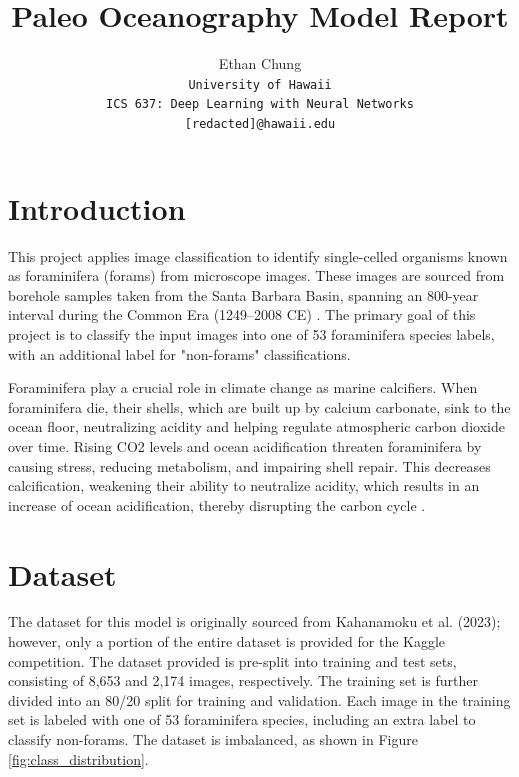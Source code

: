 \documentclass[letterpaper]{article}
\begin{document}
\title{Paleo Oceanography Model Report}

\author{Ethan Chung\\
    {\tt\small University of Hawaii}\\
    {\tt\small ICS 637: Deep Learning with Neural Networks}\\
    {\tt\small [redacted]@hawaii.edu}}

\maketitle

\section{Introduction}

    This project applies image classification to identify single-celled organisms known as foraminifera (forams) from microscope images. These images are sourced from borehole samples taken from the Santa Barbara Basin, spanning an 800-year interval during the Common Era (1249–2008 CE) \cite{kahanamoku23}. The primary goal of this project is to classify the input images into one of 53 foraminifera species labels, with an additional label for "non-forams" classifications.

    Foraminifera play a crucial role in climate change as marine calcifiers. When foraminifera die, their shells, which are built up by calcium carbonate, sink to the ocean floor, neutralizing acidity and helping regulate atmospheric carbon dioxide over time. Rising CO2 levels and ocean acidification threaten foraminifera by causing stress, reducing metabolism, and impairing shell repair. This decreases calcification, weakening their ability to neutralize acidity, which results in an increase of ocean acidification, thereby disrupting the carbon cycle \cite{kerlin17}.
    
\section{Dataset}

    The dataset for this model is originally sourced from Kahanamoku et al. (2023); however, only a portion of the entire dataset is provided for the Kaggle competition. The dataset provided is pre-split into training and test sets, consisting of 8,653 and 2,174 images, respectively. The training set is further divided into an 80/20 split for training and validation. Each image in the training set is labeled with one of 53 foraminifera species, including an extra label to classify non-forams. The dataset is imbalanced, as shown in Figure \ref{fig:class_distribution}.
    
\end{document}
